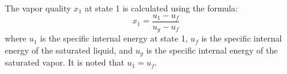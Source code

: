 The vapor quality \( x_1 \) at state 1 is calculated using the formula:  
\[
x_1 = \frac{u_1 - u_f}{u_g - u_f}
\]  
where \( u_1 \) is the specific internal energy at state 1, \( u_f \) is the specific internal energy of the saturated liquid, and \( u_g \) is the specific internal energy of the saturated vapor.  
It is noted that \( u_1 = u_f \).